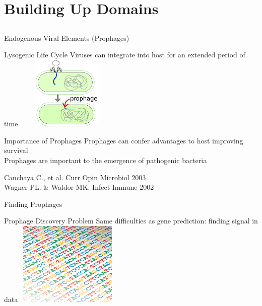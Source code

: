 \documentclass[11pt, xcolor=table]{beamer}
\begin{document}
\section{Building Up Domains}
\subsection{}
	
	\begin{frame}{Endogenous Viral Elements (Prophages)}
	\begin{block}{Lysogenic Life Cycle}
	Viruses can integrate into host for an extended period of time
	\center
	\vspace{-0.2cm}
	\includegraphics[height=3.5cm, width=5cm]{prophage.png}
	\end{block}
	\begin{block}{Importance of Prophages}
	Prophages can confer advantages to host improving survival \\ 
	Prophages are important to the emergence of pathogenic bacteria
	\end{block}
	
	\tiny{Canchaya C., et al. Curr Opin Microbiol 2003 \\ Wagner PL. \& Waldor MK. Infect Immune 2002}
	\end{frame}
	\begin{frame}{Finding Prophages}
	\begin{block}{Prophage Discovery Problem}
	Same difficulties as gene prediction: finding signal in data
	\center
	\includegraphics[height=4cm, width=5cm]{dna.png}
	\end{block}
	\end{frame}
\end{document}
